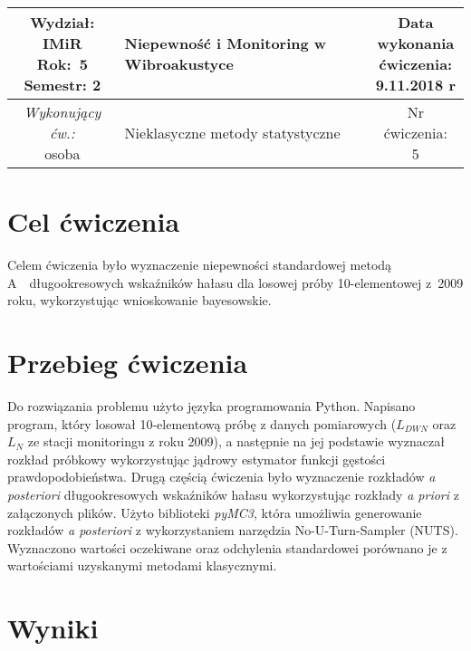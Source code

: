 \documentclass[polish,a4paper,11pt]{mwart}
\let\Oldsection\section
\renewcommand{\section}{\FloatBarrier\Oldsection}
\begin{document}
\begin{table}[h] %
  \centering
  \begin{tabular}{ | c |  >{\centering\arraybackslash}m{5.5cm} | c | }
    \hline
    \makecell{ \textbf{Wydział:} \\ IMiR \\ \textbf{Rok:}~5 \\ Semestr: 2 } &
    \textbf{\large{Niepewność i Monitoring w Wibroakustyce}} &
    \makecell{Data \\ wykonania \\ ćwiczenia: \\ 9.11.2018 r} \\ \hline
    \makecell{\emph{Wykonujący ćw.:} \\ osoba } &
    \large{Nieklasyczne metody statystyczne} &
    \makecell{Nr ćwiczenia: \\ 5} \\ \hline
  \end{tabular}
\end{table}

\section{Cel ćwiczenia}
Celem ćwiczenia było wyznaczenie niepewności standardowej metodą A~\
długookresowych wskaźników hałasu dla losowej próby 10-elementowej z~2009
roku, wykorzystując wnioskowanie bayesowskie.

\section{Przebieg ćwiczenia}
Do rozwiązania problemu użyto języka programowania Python. Napisano
program, który losował 10-elementową próbę z danych pomiarowych ($L_{DWN}$
oraz $L_N$ ze stacji monitoringu z roku 2009), a następnie na jej podstawie
wyznaczał rozkład próbkowy wykorzystując jądrowy estymator funkcji gęstości
prawdopodobieństwa. 
Drugą częścią ćwiczenia było wyznaczenie rozkładów \textit{a posteriori}
długookresowych wskaźników hałasu wykorzystując rozkłady \textit{a priori}
z załączonych plików. Użyto biblioteki \textit{pyMC3}, która umożliwia
generowanie rozkładów \textit{a posteriori} z wykorzystaniem narzędzia
No-U-Turn-Sampler (NUTS). Wyznaczono wartości oczekiwane oraz odchylenia
standardowei porównano je z wartościami uzyskanymi metodami klasycznymi.

\section{Wyniki}
\end{document}
